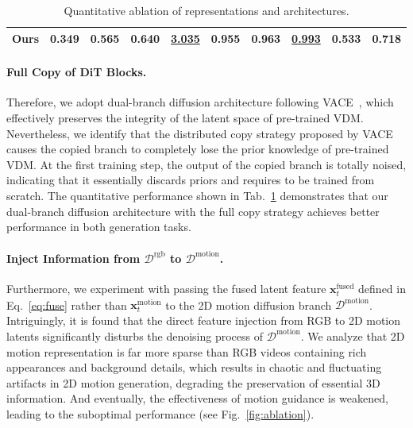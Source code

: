\begin{table}[t!]
\begin{tabular}{lccccccccc}
        \midrule
        \cellcolor{lightgray!30}Ours & \cellcolor{lightgray!30}\textbf{0.349} & \cellcolor{lightgray!30}\textbf{0.565} & \cellcolor{lightgray!30}\textbf{0.640} & \cellcolor{lightgray!30}\underline{3.035} & \cellcolor{lightgray!30}\textbf{0.955} & \cellcolor{lightgray!30}\textbf{0.963} & \cellcolor{lightgray!30}\underline{0.993} & \cellcolor{lightgray!30}\textbf{0.533} & \cellcolor{lightgray!30}\textbf{0.718}\\
        \bottomrule
    \end{tabular}
    \vspace{2pt}
    \caption{Quantitative ablation of representations and architectures.}
    \label{tab:ablation}
\vspace{-25pt}
\end{table}

\vspace{-2mm}
\paragraph{Full Copy of DiT Blocks.} Therefore, we adopt dual-branch diffusion architecture following VACE~\cite{jiang2025vace}, which effectively preserves the integrity of the latent space of pre-trained VDM. Nevertheless, we identify that the distributed copy strategy proposed by VACE~\cite{jiang2025vace} causes the copied branch to completely lose the prior knowledge of pre-trained VDM. At the first training step, the output of the copied branch is totally noised, indicating that it essentially discards priors and requires to be trained from scratch. The quantitative performance shown in Tab.~\ref{tab:ablation} demonstrates that our dual-branch diffusion architecture with the full copy strategy achieves better performance in both generation tasks.

\vspace{-2mm}
\paragraph{Inject Information from $\mathcal{D}^{\text{rgb}}$ to $\mathcal{D}^{\text{motion}}$.} Furthermore, we experiment with passing the fused latent feature $\bm{x}_t^{\text{fused}}$ defined in Eq.~\ref{eq:fuse} rather than $\bm{x}_t^{\text{motion}}$ to the 2D motion diffusion branch $\mathcal{D}^{\text{motion}}$. Intriguingly, it is found that the direct feature injection from RGB to 2D motion latents significantly disturbs the denoising process of $\mathcal{D}^{\text{motion}}$. We analyze that 2D motion representation is far more sparse than RGB videos containing rich appearances and background details, which results in chaotic and fluctuating artifacts in 2D motion generation, degrading the preservation of essential 3D information. And eventually, the effectiveness of motion guidance is weakened, leading to the suboptimal performance (see Fig.~\ref{fig:ablation}).


